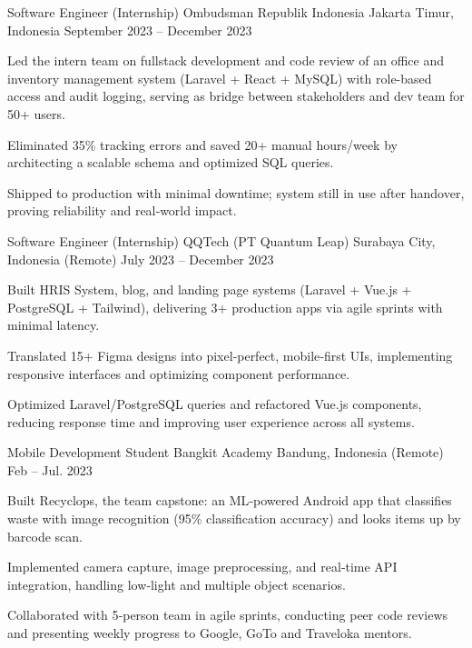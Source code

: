 \begin{cventries}
    \cventry
    {Software Engineer (Internship)} %
    {Ombudsman Republik Indonesia} %
    {Jakarta Timur, Indonesia} %
    {September 2023 – December 2023} %
    {
      \begin{cvitems} %
        \item {Led the intern team on fullstack development and code review of an office and inventory management system (Laravel + React + MySQL) with role-based access and audit logging, serving as bridge between stakeholders and dev team for 50+ users.}
        \item {Eliminated 35\% tracking errors and saved 20+ manual hours/week by architecting a scalable schema and optimized SQL queries.}
        \item {Shipped to production with minimal downtime; system still in use after handover, proving reliability and real‑world impact.}
      \end{cvitems}
    }

    \cventry
    {Software Engineer (Internship)} %
    {QQTech (PT Quantum Leap)} %
    {Surabaya City, Indonesia (Remote)} %
    {July 2023 – December 2023} %
    {
      \begin{cvitems} %
        \item {Built HRIS System, blog, and landing page systems (Laravel + Vue.js + PostgreSQL + Tailwind), delivering 3+ production apps via agile sprints with minimal latency.}
        \item {Translated 15+ Figma designs into pixel‑perfect, mobile‑first UIs, implementing responsive interfaces and optimizing component performance.}
        \item {Optimized Laravel/PostgreSQL queries and refactored Vue.js components, reducing response time and improving user experience across all systems.}
      \end{cvitems}
    }

     \cventry
    {Mobile Development Student} %
    {Bangkit Academy} %
    {Bandung, Indonesia (Remote)} %
    {Feb – Jul. 2023} %
    {
      \begin{cvitems} %
        \item {Built Recyclops, the team capstone: an ML‑powered Android app that classifies waste with image recognition (95\% classification accuracy) and looks items up by barcode scan.} 
        \item {Implemented camera capture, image preprocessing, and real‑time API integration, handling low‑light and multiple object scenarios.}
        \item {Collaborated with 5‑person team in agile sprints, conducting peer code reviews and presenting weekly progress to Google, GoTo and Traveloka mentors.}
      \end{cvitems}
    }
    

\end{cventries}

